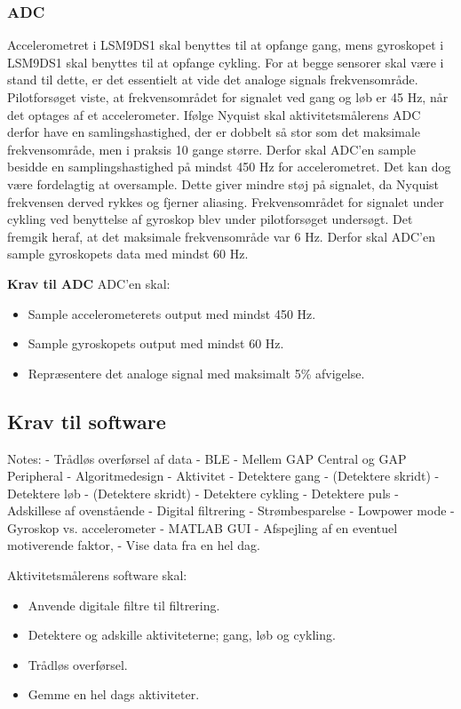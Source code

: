 \subsubsection{ADC}
Accelerometret i LSM9DS1 skal benyttes til at opfange gang, mens gyroskopet i LSM9DS1 skal benyttes til at opfange cykling. For at begge sensorer skal være i stand til dette, er det essentielt at vide det analoge signals frekvensområde. %
Pilotforsøget viste, at frekvensområdet for signalet ved gang og løb er 45 Hz, når det optages af et accelerometer. Ifølge Nyquist skal aktivitetsmålerens ADC derfor have en samlingshastighed, der er dobbelt så stor som det maksimale frekvensområde, men i praksis 10 gange større. Derfor skal ADC'en sample besidde en samplingshastighed på mindst 450 Hz for accelerometret. Det kan dog være fordelagtig at oversample. Dette giver mindre støj på signalet, da Nyquist frekvensen derved rykkes og fjerner aliasing. \newline
Frekvensområdet for signalet under cykling ved benyttelse af gyroskop blev under pilotforsøget undersøgt. Det fremgik heraf, at det maksimale frekvensområde var 6 Hz. Derfor skal ADC'en sample gyroskopets data med mindst 60 Hz.

\textbf{Krav til ADC} \newline
ADC'en skal:
\begin{itemize}
\item Sample accelerometerets output med mindst 450 Hz.
\item Sample gyroskopets output med mindst 60 Hz. 
\item Repræsentere det analoge signal med maksimalt 5\% afvigelse. 
\end{itemize}

\subsection{Krav til software}

Notes: 
- Trådløs overførsel af data
	- BLE
	- Mellem GAP Central og GAP Peripheral
- Algoritmedesign 
	- Aktivitet
		- Detektere gang 
			- (Detektere skridt)
		- Detektere løb
			- (Detektere skridt)
		- Detektere cykling
		- Detektere puls 
		- Adskillese af ovenstående
		- Digital filtrering 
	- Strømbesparelse 
		- Lowpower mode
		- Gyroskop vs. accelerometer
- MATLAB GUI
	- Afspejling af en eventuel motiverende faktor, 
	- Vise data fra en hel dag. 

Aktivitetsmålerens software skal:
\begin{itemize}
\item Anvende digitale filtre til filtrering.
\item Detektere og adskille aktiviteterne; gang, løb og cykling. 
\item Trådløs overførsel.
\item Gemme en hel dags aktiviteter. 
\end{itemize}
